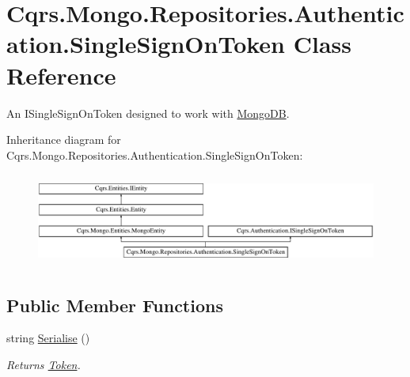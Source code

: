 \hypertarget{classCqrs_1_1Mongo_1_1Repositories_1_1Authentication_1_1SingleSignOnToken}{}\section{Cqrs.\+Mongo.\+Repositories.\+Authentication.\+Single\+Sign\+On\+Token Class Reference}
\label{classCqrs_1_1Mongo_1_1Repositories_1_1Authentication_1_1SingleSignOnToken}


An I\+Single\+Sign\+On\+Token designed to work with \hyperlink{namespaceCqrs_1_1MongoDB}{Mongo\+DB}.  


Inheritance diagram for Cqrs.\+Mongo.\+Repositories.\+Authentication.\+Single\+Sign\+On\+Token\+:\begin{figure}[H]
\begin{center}
\leavevmode
\includegraphics[height=3.102493cm]{classCqrs_1_1Mongo_1_1Repositories_1_1Authentication_1_1SingleSignOnToken}
\end{center}
\end{figure}
\subsection*{Public Member Functions}
\begin{DoxyCompactItemize}
\item 
string \hyperlink{classCqrs_1_1Mongo_1_1Repositories_1_1Authentication_1_1SingleSignOnToken_ab0ad6b0a6065a2553a093214e5a033b5_ab0ad6b0a6065a2553a093214e5a033b5}{Serialise} ()
\begin{DoxyCompactList}\small\item\em Returns \hyperlink{classCqrs_1_1Mongo_1_1Repositories_1_1Authentication_1_1SingleSignOnToken_a48105fdf07433e74837cdc922d0b2d1f_a48105fdf07433e74837cdc922d0b2d1f}{Token}. \end{DoxyCompactList}\end{DoxyCompactItemize}
